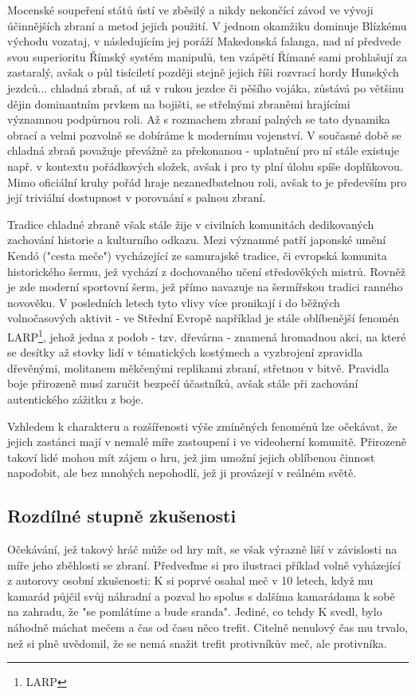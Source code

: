 Mocenské soupeření států ústí ve zběsilý a nikdy nekončící závod ve vývoji účinnějších zbraní a metod jejich použití. V jednom okamžiku dominuje Blízkému východu vozataj, v následujícím jej poráží Makedonská falanga, nad ní předvede svou superioritu Římský systém manipulů, ten vzápětí Římané sami prohlašují za zastaralý, avšak o půl tisíciletí později stejně jejich říši rozvrací hordy Hunských jezdců... chladná zbraň, ať už v rukou jezdce či pěšího vojáka, zůstává po většinu dějin dominantním prvkem na bojišti, se střelnými zbraněmi hrajícími významnou podpůrnou roli. Až s rozmachem zbraní palných se tato dynamika obrací a velmi pozvolně se dobíráme k modernímu vojenství. V současné době se chladná zbraň považuje převážně za překonanou - uplatnění pro ní stále existuje např. v kontextu pořádkových složek, avšak i pro ty plní úlohu spíše doplňkovou. Mimo oficiální kruhy pořád hraje nezanedbatelnou roli, avšak to je především pro její triviální dostupnost v porovnání s palnou zbraní.

Tradice chladné zbraně však stále žije v civilních komunitách dedikovaných zachování historie a kulturního odkazu. Mezi významné patří japonské umění Kendó ("cesta meče") vycházející ze samurajské tradice, či evropská komunita historického šermu, jež vychází z dochovaného učení středověkých mistrů. Rovněž je zde moderní sportovní šerm, jež přímo navazuje na šermířskou tradici ranného novověku. V posledních letech tyto vlivy více pronikají i do běžných volnočasových aktivit - ve Střední Evropě například je stále oblíbenější fenomén LARP\footnote{\ac{LARP}}, jehož jedna z podob - tzv. dřevárna - znamená hromadnou akci, na které se desítky až stovky lidí v tématických kostýmech a vyzbrojení zpravidla dřevěnými, molitanem měkčenými replikami zbraní, střetnou v bitvě. Pravidla boje přirozeně musí zaručit bezpečí účastníků, avšak stále při zachování autentického zážitku z boje.  

Vzhledem k charakteru a rozšířenosti výše zmíněných fenoménů lze očekávat, že jejich zastánci mají v nemalé míře zastoupení i ve videoherní komunitě. Přirozeně takoví lidé mohou mít zájem o hru, jež jim umožní jejich oblíbenou činnost napodobit, ale bez mnohých nepohodlí, jež ji provázejí v reálném světě.

\subsection{Rozdílné stupně zkušenosti}
Očekávání, jež takový hráč může od hry mít, se však výrazně liší v závislosti na míře jeho zběhlosti se zbraní. Předveďme si pro ilustraci příklad volně vyházející z autorovy osobní zkušenosti:
K si poprvé osahal meč v 10 letech, když mu kamarád půjčil svůj náhradní a pozval ho spolus s dalšíma kamarádama k sobě na zahradu, že "se pomlátíme a bude sranda". Jediné, co tehdy K svedl, bylo náhodně máchat mečem a čas od času něco trefit. Citelně nenulový čas mu trvalo, než si plně uvědomil, že se nemá snažit trefit protivníkův meč, ale protivníka. 


